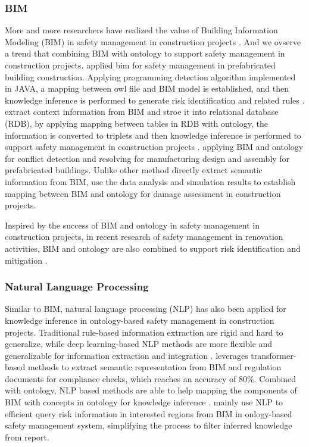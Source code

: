 \subsubsection*{BIM} 
More and more researchers have realized the value of Building Information Modeling (BIM) in safety management in construction projects \cite[]{ding2016construction}.
And we ovserve a trend that combining BIM with ontology to support safety management in construction projects. 
\cite{shen2022bim} applied bim for safety management in prefabricated building construction. Applying programming detection algorithm implemented in JAVA, a mapping between 
owl file and BIM model is established, and then knowledge inference is performed to generate risk identification and related rules \cite[]{shen2022bim}. 
\cite{zhou2023bim} extract context information from BIM and stroe it into relational database (RDB), by applying mapping between 
tables in RDB with ontology, the information is converted to triplets and then knowledge inference is performed to support safety management in construction projects \cite[]{zhou2023bim}.
\cite{qi2023bim} applying BIM and ontology for conflict detection and resolving for manufacturing design and assembly for prefabricated buildings. 
Unlike other method directly extract semantic information from BIM, \cite{xu2022ontology} use the data analysis and simulation results to establish mapping between BIM and ontology for damage assessment in construction projects.

Inspired by the success of BIM and ontology in safety management in construction projects, in recent research of safety management in renovation activities, BIM and ontology are also combined to support risk identification and mitigation \cite[]{doukari2024ontology}.

\subsubsection*{Natural Language Processing}
Similar to BIM, natural language processing (NLP) has also been applied for knowledge inference in ontology-based safety management in construction projects.
Traditional rule-based information extraction are rigid and hard to generalize, while deep learning-based NLP methods are more flexible and generalizable for information 
extraction and integration \cite[]{zhang2021semantic}. \cite{zhang2021semantic} leverages transformer-based methods to extract semantic representation from BIM and regulation documents for compliance checks, 
which reaches an accuracy of 80\%. Combined with ontology, NLP based methods are able to help mapping the components of BIM with concepts in ontology for knowledge inference \cite[]{ding2016construction,zhou2021semantic}. 
\cite{shen2022bim} mainly use NLP to efficient query risk information in interested regions from BIM in onlogy-based safety management system, 
simplifying the process to filter inferred knowledge from report.

